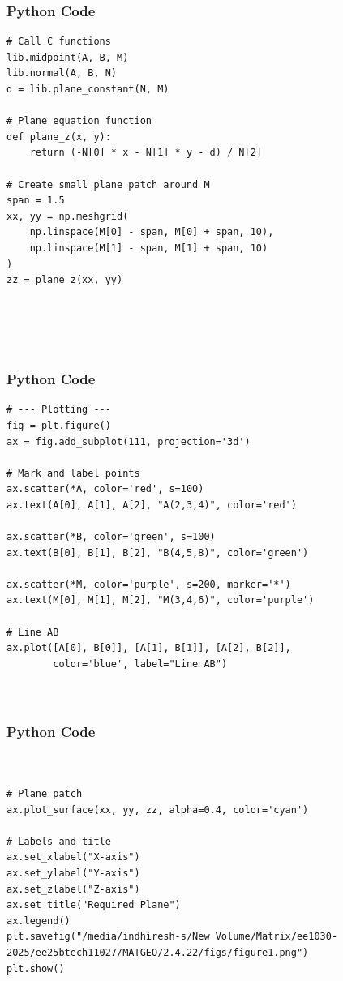 \documentclass{beamer}
\begin{document}
\begin{frame}[fragile]
    \frametitle{Python Code}

    \begin{lstlisting}
# Call C functions
lib.midpoint(A, B, M)
lib.normal(A, B, N)
d = lib.plane_constant(N, M)

# Plane equation function
def plane_z(x, y):
    return (-N[0] * x - N[1] * y - d) / N[2]

# Create small plane patch around M
span = 1.5
xx, yy = np.meshgrid(
    np.linspace(M[0] - span, M[0] + span, 10),
    np.linspace(M[1] - span, M[1] + span, 10)
)
zz = plane_z(xx, yy)





    \end{lstlisting}
\end{frame}
\begin{frame}[fragile]
    \frametitle{Python Code}

    \begin{lstlisting}
# --- Plotting ---
fig = plt.figure()
ax = fig.add_subplot(111, projection='3d')

# Mark and label points
ax.scatter(*A, color='red', s=100)
ax.text(A[0], A[1], A[2], "A(2,3,4)", color='red')

ax.scatter(*B, color='green', s=100)
ax.text(B[0], B[1], B[2], "B(4,5,8)", color='green')

ax.scatter(*M, color='purple', s=200, marker='*')
ax.text(M[0], M[1], M[2], "M(3,4,6)", color='purple')

# Line AB
ax.plot([A[0], B[0]], [A[1], B[1]], [A[2], B[2]],
        color='blue', label="Line AB")



    \end{lstlisting}
\end{frame}
\begin{frame}[fragile]
    \frametitle{Python Code}

    \begin{lstlisting}


# Plane patch
ax.plot_surface(xx, yy, zz, alpha=0.4, color='cyan')

# Labels and title
ax.set_xlabel("X-axis")
ax.set_ylabel("Y-axis")
ax.set_zlabel("Z-axis")
ax.set_title("Required Plane")
ax.legend()
plt.savefig("/media/indhiresh-s/New Volume/Matrix/ee1030-2025/ee25btech11027/MATGEO/2.4.22/figs/figure1.png")
plt.show()


    \end{lstlisting}
\end{frame}
\end{document}
